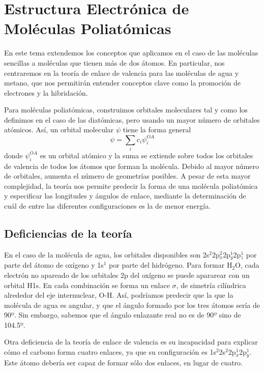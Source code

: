 \chapter{Estructura Electrónica de Moléculas Poliatómicas}
En este tema extendemos los conceptos que aplicamos en
el caso de las moléculas sencillas a moléculas que tienen
más de dos átomos. En particular, nos centraremos en la 
teoría de enlace de valencia para las moléculas de
agua y metano, que nos permitirán entender 
conceptos clave como la promoción de electrones y la
hibridación.

Para moléculas poliatómicas, construimos orbitales
moleculares tal y como los definimos en el caso de
las diatómicas, pero usando un mayor número de
orbitales atómicos. Así, un orbital molecular $\psi$
tiene la forma general
\begin{equation}
    \psi = \sum_ic_i\psi_i^{OA}
\end{equation}
donde $\psi_i^{OA}$ es un orbital atómico y la
suma se extiende sobre todos los orbitales de valencia
de todos los átomos que forman la molécula.
Debido al mayor número de orbitales, aumenta el
número de geometrías posibles. A pesar de esta mayor
complejidad, la teoría nos permite predecir la
forma de una molécula poliatómica y especificar las
longitudes y ángulos de enlace, mediante la 
determinación de cuál de entre las diferentes 
configuraciones es la de menor energía. 

\section{Deficiencias de la teoría}
En el caso de la molécula de agua, los orbitales
disponibles son 2s$^2$2p$_x^2$2p$_y^1$2p$_z^1$
por parte del átomo de oxígeno y 1s$^1$ por parte
del hidrógeno. Para formar H$_2$O, cada electrón
no apareado de los orbitales 2p del oxígeno se
puede apararear con un orbital H1s. En cada
combinación se forma un enlace $\sigma$, de
simetría cilíndrica alrededor del eje internuclear,
O-H. Así, podríamos predecir que la que la
molécula de agua es angular, y que el ángulo 
formado por los tres átomos sería de 90º. Sin embargo,
sabemos que el ángulo enlazante real no es de 90º sino
de 104.5º.

Otra deficiencia de la teoría de enlace de valencia
es su incapacidad para explicar cómo el carbono
forma cuatro enlaces, ya que su configuración es 
1s$^2$2s$^2$2p$^1_x$2p$_y^1$. Este átomo debería 
ser capaz de formar sólo dos enlaces, en lugar de
cuatro.

